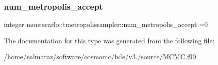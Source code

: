 \mbox{\label{structmontecarlo_1_1tmetropolissampler_a1b0be11a09ec4146a84b6e42da074d1b}} 
\subsubsection{\texorpdfstring{num\+\_\+metropolis\+\_\+accept}{num\_metropolis\_accept}}
{\footnotesize\ttfamily integer montecarlo\+::tmetropolissampler\+::num\+\_\+metropolis\+\_\+accept =0\hspace{0.3cm}{\ttfamily [private]}}



The documentation for this type was generated from the following file\+:\begin{DoxyCompactItemize}
\item 
/home/ealmaraz/software/cosmomc/bde/v3./source/\mbox{\hyperlink{MCMC_8f90}{M\+C\+M\+C.\+f90}}\end{DoxyCompactItemize}
